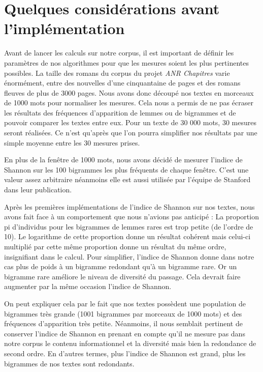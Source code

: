 \documentclass[a4paper,twoside,12pt]{book}
\begin{document}
\section{Quelques considérations avant l'implémentation}

Avant de lancer les calculs sur notre corpus, il est important de définir les paramètres de nos algorithmes pour que les mesures soient les plus pertinentes possibles. La taille des romans du corpus du projet \textit{ANR Chapitres} varie énormément, entre des nouvelles d'une cinquantaine de pages et des romans fleuves de plus de 3000 pages. Nous avons donc découpé nos textes en morceaux de 1000 mots pour normaliser les mesures. Cela nous a permis de ne pas écraser les résultats des fréquences d'apparition de lemmes ou de bigrammes et de pouvoir comparer les textes entre eux. Pour un texte de 30 000 mots, 30 mesures seront réalisées. Ce n'est qu'après que l'on pourra simplifier nos résultats par une simple moyenne entre les 30 mesures prises. 

En plus de la fenêtre de 1000 mots, nous avons décidé de mesurer l'indice de Shannon sur les 100 bigrammes les plus fréquents de chaque fenêtre. C'est une valeur assez arbitraire néanmoins elle est aussi utilisée par l'équipe de Stanford dans leur publication. 

Après les premières implémentations de l'indice de Shannon sur nos textes, nous avons fait face à un comportement que nous n'avions pas anticipé : La proportion pi d'individus pour les bigrammes de lemmes rares est trop petite (de l'ordre de 10). Le logarithme de cette proportion donne un résultat cohérent mais celui-ci multiplié par cette même proportion donne un résultat du même ordre, insignifiant dans le calcul. Pour simplifier, l'indice de Shannon donne dans notre cas plus de poids à un bigramme redondant qu'à un bigramme rare. Or un bigramme rare améliore le niveau de diversité du passage. Cela devrait faire augmenter par la même occasion l'indice de Shannon.

 On peut expliquer cela par le fait que nos textes possèdent une population de bigrammes très grande (1001 bigrammes par morceaux de 1000 mots) et des fréquences d'apparition très petite. Néanmoins, il nous semblait pertinent de conserver l'indice de Shannon en prenant en compte qu'il ne mesure pas dans notre corpus le contenu informationnel et la diversité mais bien la redondance de second ordre. En d'autres termes, plus l'indice de Shannon est grand, plus les bigrammes de nos textes sont redondants.
 
\end{document}
